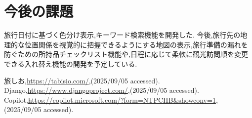 \documentclass[a4j,twocolumn]{jsarticle}
\begin{document}
\section{今後の課題}
\label{sec:org6a446a1}
旅行日付に基づく色分け表示,キーワード検索機能を開発した.
今後,旅行先の地理的な位置関係を視覚的に把握できるようにする地図の表示,旅行準備の漏れを防ぐための所持品チェックリスト機能や,日程に応じて柔軟に観光訪問順を変更できる入れ替え機能の開発を予定している.




\small\setlength\baselineskip{10pt}
\begin{thebibliography}{9}

 旅しお,\url{https://tabisio.com/},(2025/09/05 accessed).
Django,\url{https://www.djangoproject.com/},(2025/09/05 accessed).
Copilot,\url{https://copilot.microsoft.com/?form=NTPCHB&showconv=1},(2025/09/05 accessed).
\end{thebibliography}
\end{document}
